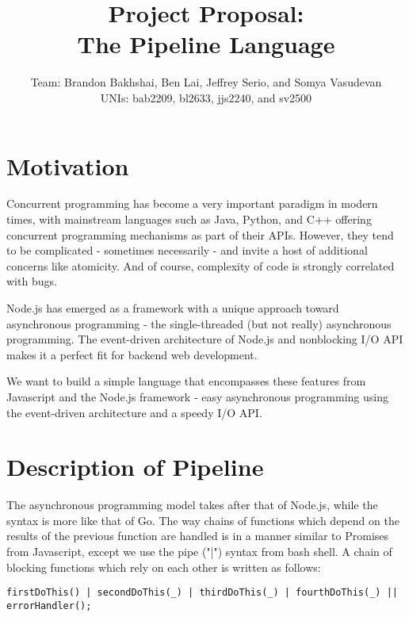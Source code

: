 \documentclass[11pt]{article}
\title{\textbf{Project Proposal:\\ The Pipeline Language}}
\author{Team: Brandon Bakhshai, Ben Lai, Jeffrey Serio, and Somya Vasudevan \\ UNIs: bab2209, bl2633, jjs2240, and sv2500}
\begin{document}
\maketitle
\thispagestyle{empty}
\renewcommand{\thesubsubsection}{\thesubsection.\alph{subsubsection}.}


\section{Motivation}
\hspace{0.5cm} Concurrent programming has become a very important paradigm in 
modern times, with mainstream languages such as Java, Python, and C++ offering 
concurrent programming mechanisms as part of their APIs. However, they tend to 
be complicated - sometimes necessarily - and invite a host of additional 
concerns like atomicity. And of course, complexity of code is strongly 
correlated with bugs.

Node.js has emerged as a framework with a unique approach toward asynchronous 
programming - the single-threaded (but not really) asynchronous programming. 
The event-driven architecture of Node.js and nonblocking I/O API makes it a 
perfect fit for backend web development.

We want to build a simple language that encompasses these features from 
Javascript and the Node.js framework - easy asynchronous programming using the 
event-driven architecture and a speedy I/O API.

\section{Description of Pipeline}

\hspace{0.5cm} The asynchronous programming model takes after that of Node.js, 
while the syntax is more like that of Go. The way chains of functions which 
depend on the results of the previous function are handled is in a manner 
similar to Promises from Javascript, except we use the pipe ("|") syntax from 
bash shell. A chain of blocking functions which rely on each other is written 
as follows:

\begin{lstlisting}
firstDoThis() | secondDoThis(_) | thirdDoThis(_) | fourthDoThis(_) || errorHandler();
\end{lstlisting}
\end{document}
